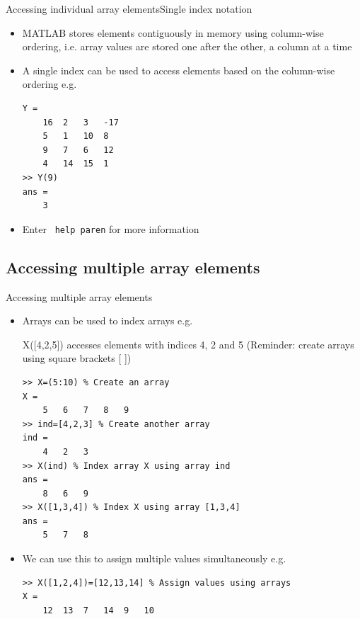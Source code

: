 \documentclass{beamer}
\begin{document}
\begin{frame}[fragile]{Accessing individual array elements}{Single index notation}
	\begin{itemize}
		\item MATLAB stores elements contiguously in memory using column-wise ordering, i.e. array values are stored one after the other, a column at a time
		\item A single index can be used to access elements based on the column-wise ordering e.g.
		
		\begin{lstlisting}[style=Matlab-editor,basicstyle=\small]
Y = 
	16	2	3	-17
	5	1	10	8
	9	7	6	12
	4	14	15	1
>> Y(9)
ans = 
	3   
		\end{lstlisting}
		\item Enter \texttt{ help paren} for more information
	\end{itemize}
\end{frame}

\subsection{Accessing multiple array elements}
\begin{frame}[fragile]{Accessing multiple array elements}
	\begin{itemize}
		\item Arrays can be used to index arrays e.g.
		
		X([4,2,5]) accesses elements with indices 4, 2 and 5
		(Reminder: create arrays using square brackets [ ])
		
		\begin{lstlisting}[style=Matlab-editor,basicstyle=\scriptsize]
>> X=(5:10) % Create an array
X = 
	5	6	7	8	9
>> ind=[4,2,3] % Create another array
ind = 
	4	2	3
>> X(ind) % Index array X using array ind
ans = 
	8	6	9
>> X([1,3,4]) % Index X using array [1,3,4]
ans =
	5	7	8
		\end{lstlisting}
		\item We can use this to assign multiple values simultaneously e.g.
		
		\begin{lstlisting}[style=Matlab-editor,basicstyle=\scriptsize]
>> X([1,2,4])=[12,13,14] % Assign values using arrays
X = 
	12	13	7	14	9	10
		\end{lstlisting}
	\end{itemize}
\end{frame}
\end{document}
